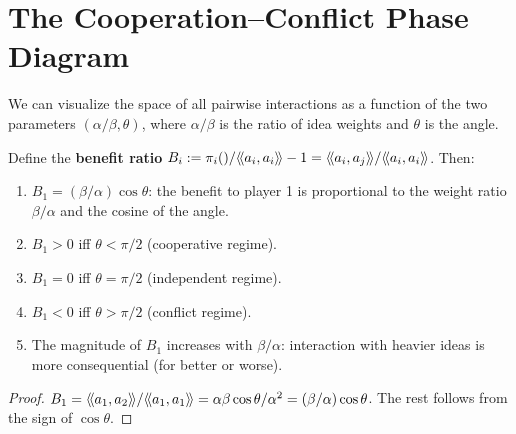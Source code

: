 \section{The Cooperation--Conflict Phase Diagram}

We can visualize the space of all pairwise interactions as a function of
the two parameters $(\alpha/\beta, \theta)$, where $\alpha/\beta$ is the
ratio of idea weights and $\theta$ is the angle.

\begin{theorem}
\label{thm:phase-diagram}
Define the \textbf{benefit ratio} $B_i := \pi_{i}() / \langle\!\langle a_i, a_i \rangle\!\rangle - 1 =
\langle\!\langle a_i, a_j \rangle\!\rangle / \langle\!\langle a_i, a_i \rangle\!\rangle$. Then:
\begin{enumerate}
\item $B_1 = (\beta/\alpha)\cos\theta$: the benefit to player 1 is proportional
to the weight ratio $\beta/\alpha$ and the cosine of the angle.
\item $B_1 > 0$ iff $\theta < \pi/2$ (cooperative regime).
\item $B_1 = 0$ iff $\theta = \pi/2$ (independent regime).
\item $B_1 < 0$ iff $\theta > \pi/2$ (conflict regime).
\item The magnitude of $B_1$ increases with $\beta/\alpha$: interaction with
heavier ideas is more consequential (for better or worse).
\end{enumerate}
\end{theorem}

\begin{proof}
$B_1 = \langle\!\langle a_1, a_2 \rangle\!\rangle / \langle\!\langle a_1, a_1 \rangle\!\rangle = \alpha\beta\cos\theta / \alpha^2 =
(\beta/\alpha)\cos\theta$. The rest follows from the sign of $\cos\theta$.
\end{proof}

